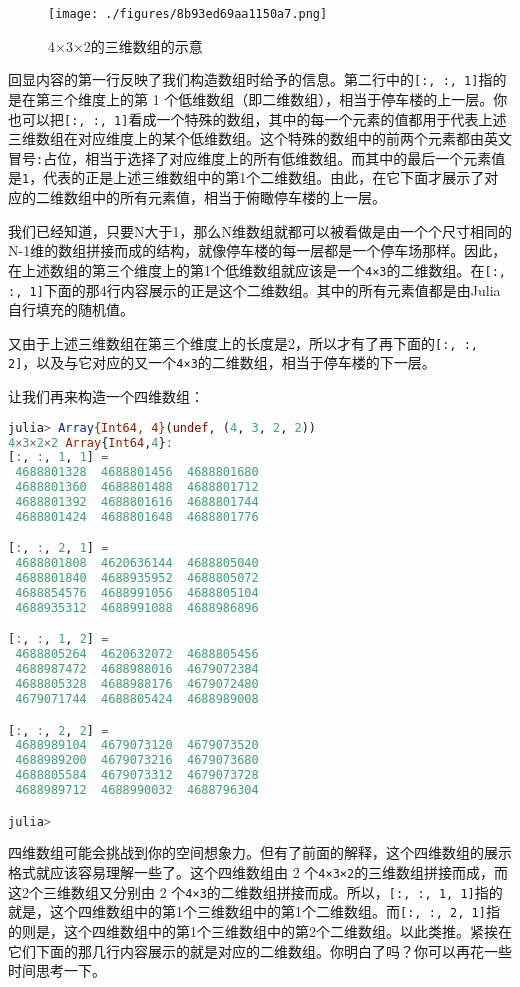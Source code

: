 \begin{figure}[ht]
\centering
\texttt{[image: ./figures/8b93ed69aa1150a7.png]}
\caption{4×3×2的三维数组的示意} \label{fig_JuC9S3_1}
\end{figure}


回显内容的第一行反映了我们构造数组时给予的信息。第二行中的\verb|[:, :, 1]|指的是在第三个维度上的第 1 个低维数组（即二维数组），相当于停车楼的上一层。你也可以把\verb|[:, :, 1]|看成一个特殊的数组，其中的每一个元素的值都用于代表上述三维数组在对应维度上的某个低维数组。这个特殊的数组中的前两个元素都由英文冒号\verb|:|占位，相当于选择了对应维度上的所有低维数组。而其中的最后一个元素值是\verb|1|，代表的正是上述三维数组中的第1个二维数组。由此，在它下面才展示了对应的二维数组中的所有元素值，相当于俯瞰停车楼的上一层。

我们已经知道，只要N大于1，那么N维数组就都可以被看做是由一个个尺寸相同的N-1维的数组拼接而成的结构，就像停车楼的每一层都是一个停车场那样。因此，在上述数组的第三个维度上的第1个低维数组就应该是一个\verb|4×3|的二维数组。在\verb|[:, :, 1]|下面的那4行内容展示的正是这个二维数组。其中的所有元素值都是由Julia自行填充的随机值。

又由于上述三维数组在第三个维度上的长度是2，所以才有了再下面的\verb|[:, :, 2]|，以及与它对应的又一个\verb|4×3|的二维数组，相当于停车楼的下一层。

让我们再来构造一个四维数组：

\begin{lstlisting}[language=julia]
julia> Array{Int64, 4}(undef, (4, 3, 2, 2))
4×3×2×2 Array{Int64,4}:
[:, :, 1, 1] =
 4688801328  4688801456  4688801680
 4688801360  4688801488  4688801712
 4688801392  4688801616  4688801744
 4688801424  4688801648  4688801776

[:, :, 2, 1] =
 4688801808  4620636144  4688805040
 4688801840  4688935952  4688805072
 4688854576  4688991056  4688805104
 4688935312  4688991088  4688986896

[:, :, 1, 2] =
 4688805264  4620632072  4688805456
 4688987472  4688988016  4679072384
 4688805328  4688988176  4679072480
 4679071744  4688805424  4688989008

[:, :, 2, 2] =
 4688989104  4679073120  4679073520
 4688989200  4679073216  4679073680
 4688805584  4679073312  4679073728
 4688989712  4688990032  4688796304

julia> 
\end{lstlisting}

四维数组可能会挑战到你的空间想象力。但有了前面的解释，这个四维数组的展示格式就应该容易理解一些了。这个四维数组由 2 个\verb|4×3×2|的三维数组拼接而成，而这2个三维数组又分别由 2 个\verb|4×3|的二维数组拼接而成。所以，\verb|[:, :, 1, 1]|指的就是，这个四维数组中的第1个三维数组中的第1个二维数组。而\verb|[:, :, 2, 1]|指的则是，这个四维数组中的第1个三维数组中的第2个二维数组。以此类推。紧挨在它们下面的那几行内容展示的就是对应的二维数组。你明白了吗？你可以再花一些时间思考一下。

